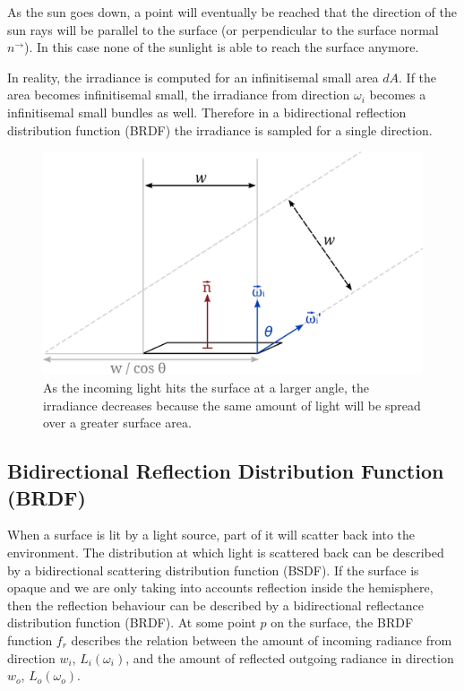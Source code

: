 \documentclass[11pt,a4paper]{report}
\begin{document}
As the sun goes down, a point will eventually be reached that the direction of the sun rays will be parallel to the surface (or perpendicular to the surface normal $n^\rightarrow$). In this case none of the sunlight is able to reach the surface anymore.

In reality, the irradiance is computed for an infinitisemal small area $dA$. If the area becomes infinitisemal small, the irradiance from direction $\omega_i$ becomes a infinitisemal small bundles as well. Therefore in a bidirectional reflection distribution function (BRDF) the irradiance is sampled for a single direction.


\begin{figure}[h]
\begin{center}
\includegraphics[scale=1.4]{images/svg/irradiance_radiance.jpg}
\caption{As the incoming light hits the surface at a larger angle, the irradiance decreases because the same amount of light will be spread over a greater surface area.}
\label{cosine_term_visualization}
\end{center}
\end{figure}


\subsection{Bidirectional Reflection Distribution Function (BRDF)}

When a surface is lit by a light source, part of it will scatter back into the environment. The distribution at which light is scattered back can be described by a bidirectional scattering distribution function (BSDF). If the surface is opaque and we are only taking into accounts reflection inside the hemisphere, then the reflection behaviour can be described by a bidirectional reflectance distribution function (BRDF). At some point $p$ on the surface, the BRDF function $f_r$ describes the relation between the amount of incoming radiance from direction $w_i$, $L_i(\omega_i)$, and the amount of reflected outgoing radiance in direction $w_o$, $L_o(\omega_o)$.
\end{document}
